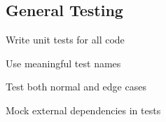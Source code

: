 \subsection{General Testing}

Write unit tests for all code

Use meaningful test names

Test both normal and edge cases

Mock external dependencies in tests